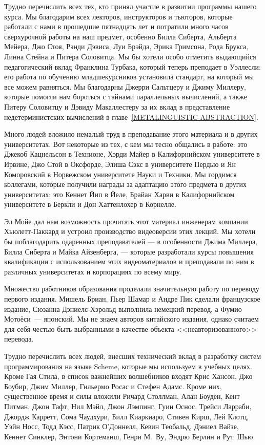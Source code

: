 Трудно перечислить всех тех, кто принял участие в
развитии программы нашего курса.  Мы благодарим всех лекторов,
инструкторов и тьюторов, которые работали с нами в прошедшие
пятнадцать лет и потратили много часов сверхурочной работы на наш предмет,
особенно Билла Сиберта, Альберта Мейера, Джо Стоя, Рэнди Дэвиса, Луи
Брэйда, Эрика Гримсона, Рода Брукса, Линна Стейна и Питера
Соловитца. Мы бы хотели особо отметить выдающийся педагогический вклад 
Франклина Турбака, который теперь преподает в Уэллесли: его работа по
обучению младшекурсников установила стандарт, на который мы все
можем равняться.  Мы благодарны Джерри Сальтцеру и Джиму Миллеру,
которые помогли нам бороться с тайнами параллельных вычислений, а
также Питеру Соловитцу и Дэвиду Макаллестеру за их вклад в
представление недетерминистских вычислений в 
главе~\ref{METALINGUISTIC-ABSTRACTION}.

Много людей вложило немалый труд в преподавание этого
материала и в других университетах.  Вот некоторые из тех, с кем мы тесно
общались в работе: это Джекоб Кацнельсон в Технионе, Хэрди Майер в
Калифорнийском университете в Ирвине, Джо Стой в Оксфорде, Элиша Сэкс
в университете Пердью и Ян Коморовский в Норвежском университете Науки 
и Техники.  Мы гордимся коллегами, которые получили
награды за адаптацию этого предмета в других университетах: это
Кеннет Йип в Йеле, Брайан Харви в Калифорнийском университете в
Беркли и Дон Хаттенлохер в Корнелле.

Эл Мойе дал нам возможность прочитать этот материал инженерам 
компании Хьюлетт-Пак\-кард и устроил производство видеоверсии этих лекций.  Мы
хотели бы поблагодарить одаренных преподавателей --- в особенности Джима 
Миллера, Билла Сиберта и Майка Айзенберга, --- которые разработали
курсы повышения квалификации с использованием этих видеоматериалов и
преподавали по ним в различных университетах и корпорациях по всему миру.

Множество работников образования проделали значительную
работу по переводу первого издания. Мишель Бриан, Пьер Шамар и Андре
Пик сделали французское издание, Сюзанна Дэ\-ни\-елс-Хэ\-рольд выполнила
немецкий перевод, а Фумио Мото\"еси~--- японский.  Мы не
знаем авторов китайского издания, однако считаем для себя честью быть
выбранными в качестве объекта <<неавторизованного>> перевода.

Трудно перечислить всех людей, внесших технический вклад в
разработку систем программирования на языке Scheme, которые мы
используем в учебных целях.  Кроме Гая Стила, в список важнейших
волшебников входят Крис Хансон, Джо Боубир, Джим Миллер,
Гильермо Росас и Стефен Адамс.  Кроме них, существенное время и силы
вложили Ричард Столлман, Алан Боуден, Кент Питман, Джон Тафт, Нил
Мэйл, Джон Лэмпинг, Гуин Оснос, Трейси Ларраби, Джордж Карретт, Сома
Чаудхури, Билл Киаркиаро, Стивен Кирш, Лей Клотц, Уэйн Носс, Тодд Кэсс, 
Патрик О'Доннелл, Кевин Теобальд, Дэниел Вайзе, Кеннет Синклер, Энтони 
Кортеманш, Генри М.~Ву, Эндрю Берлин и Рут~Шью.

